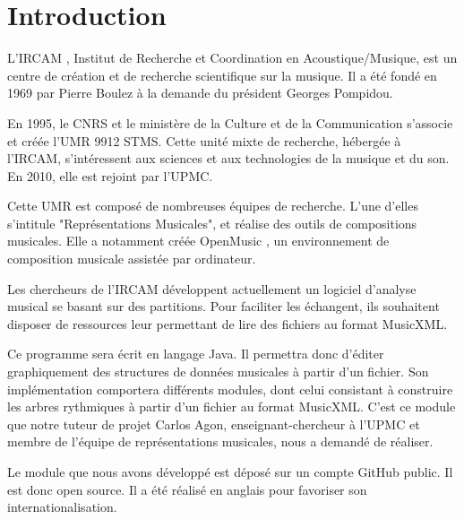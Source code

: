 \section{Introduction}


L'IRCAM \cite{ircam}, Institut de Recherche et Coordination en Acoustique/Musique, est un centre de création et de recherche scientifique sur la musique. Il a été fondé en 1969 par Pierre Boulez à la demande du président Georges Pompidou. 

\par
En 1995, le CNRS et le ministère de la Culture et de la Communication s'associe et créée l'UMR 9912 STMS. Cette unité mixte de recherche, hébergée à l'IRCAM, s'intéressent aux sciences et aux technologies de la musique et du son. En 2010, elle est rejoint par l'UPMC.

\par
Cette UMR est composé de nombreuses équipes de recherche. L'une d'elles s'intitule "Représentations Musicales", et réalise des outils de compositions musicales. Elle a notamment créée OpenMusic \cite{openmusic}, un environnement de composition musicale assistée par ordinateur.

\par
Les chercheurs de l'IRCAM développent actuellement un logiciel d'analyse musical se basant sur des partitions. Pour faciliter les échangent, ils souhaitent disposer de ressources leur permettant de lire des fichiers au format MusicXML. %


\par
Ce programme sera écrit en langage Java. Il permettra donc d'éditer graphiquement des structures de données musicales à partir d'un fichier. Son implémentation comportera différents modules, dont celui consistant à construire les arbres rythmiques à partir d'un fichier au format MusicXML. C'est ce module que notre tuteur de projet Carlos Agon, enseignant-chercheur à l'UPMC et membre de l'équipe de représentations musicales, nous a demandé de réaliser.

\par
Le module que nous avons développé est déposé sur un compte GitHub \cite{github_pstl} public. Il est donc open source. Il a été réalisé en anglais pour favoriser son internationalisation.

